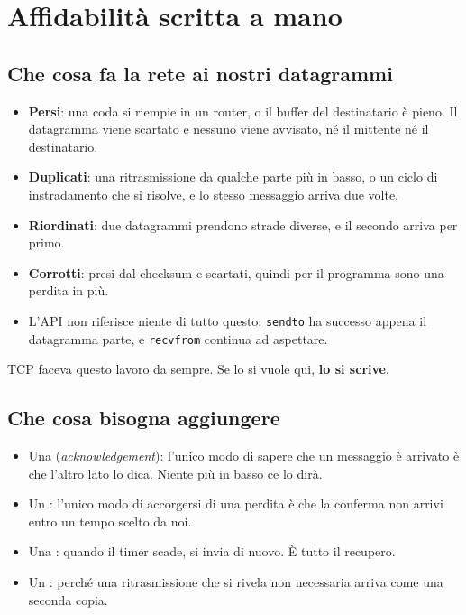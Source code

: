 \section{Affidabilità scritta a mano}

\subsection{Che cosa fa la rete ai nostri datagrammi}

\begin{itemize}
    \item \textbf{Persi}: una coda si riempie in un router, o il buffer del destinatario è pieno. Il datagramma viene
          scartato e nessuno viene avvisato, né il mittente né il destinatario.
    \item \textbf{Duplicati}: una ritrasmissione da qualche parte più in basso, o un ciclo di instradamento che si risolve,
          e lo stesso messaggio arriva due volte.
    \item \textbf{Riordinati}: due datagrammi prendono strade diverse, e il secondo arriva per primo.
    \item \textbf{Corrotti}: presi dal checksum e scartati, quindi per il programma sono una perdita in più.
    \item L'API non riferisce niente di tutto questo: \texttt{sendto} ha successo appena il datagramma parte, e
          \texttt{recvfrom} continua ad aspettare.
\end{itemize}
TCP faceva questo lavoro da sempre. Se lo si vuole qui, \textbf{lo si scrive}.

\subsection{Che cosa bisogna aggiungere}

\begin{itemize}
    \item Una  (\emph{acknowledgement}): l'unico modo di sapere che un messaggio è arrivato è che l'altro
          lato lo dica. Niente più in basso ce lo dirà.
    \item Un : l'unico modo di accorgersi di una perdita è che la conferma non arrivi entro un tempo scelto da
          noi.
    \item Una : quando il timer scade, si invia di nuovo. È tutto il recupero.
    \item Un : perché una ritrasmissione che si rivela non necessaria arriva come una seconda copia.
\end{itemize}

